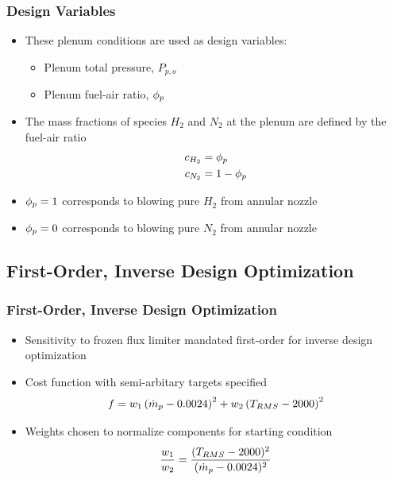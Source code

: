 \documentclass{beamer}
\begin{document}
\begin{frame}
  \frametitle{Design Variables}
  \begin{itemize}
    \item These plenum conditions are used as design variables:
      \begin{itemize}
        \item Plenum total pressure, $P_{p,o}$
        \item Plenum fuel-air ratio, $\phi_p$
      \end{itemize}
    \item The mass fractions of species $H_2$ and $N_2$ at the plenum are
      defined by the fuel-air ratio
\begin{equation*}
  \begin{aligned}
    c_{H_2} &= \phi_p \\
    c_{N_2} &= 1 - \phi_p
  \end{aligned}
\end{equation*}
  \item $\phi_p = 1$ corresponds to blowing pure $H_2$ from annular nozzle
  \item $\phi_p = 0$ corresponds to blowing pure $N_2$ from annular nozzle
  \end{itemize}
\end{frame}

\subsection{First-Order, Inverse Design Optimization}

\begin{frame}
  \frametitle{First-Order, Inverse Design Optimization}
  \begin{itemize}
    \item Sensitivity to frozen flux limiter mandated first-order for inverse
      design optimization
    \item Cost function with semi-arbitary targets specified
      \[
        f = w_1\left( \dot{m}_p - 0.0024 \right)^2 
          + w_2\left( T_{RMS} - 2000 \right)^2
      \]
    \item Weights chosen to normalize components for starting condition
      \[
        \frac{w_1}{w_2} = \frac{(T_{RMS} - 2000)^2}{(\dot{m}_p - 0.0024)^2}
      \]
  \end{itemize}
\end{frame}
\end{document}
